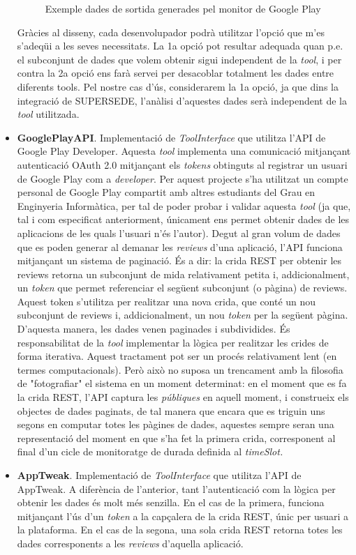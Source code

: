 \begin{itemize}
\begin{figure}[!h]
\decoRule
\caption[Exemple dades de sortida generades pel monitor de Google Play]{Exemple dades de sortida generades pel monitor de Google Play}
\label{fig:Figura13}
\end{figure}
Gràcies al disseny, cada desenvolupador podrà utilitzar l'opció que m'es s'adeqüi a les seves necessitats. La 1a opció pot resultar adequada quan p.e. el subconjunt de dades que volem obtenir sigui independent de la \textit{tool}, i per contra la 2a opció ens farà servei per desacoblar totalment les dades entre diferents tools. Pel nostre cas d'ús, considerarem la 1a opció, ja que dins la integració de SUPERSEDE, l'anàlisi d'aquestes dades serà independent de la \textit{tool} utilitzada.
\item \textbf{GooglePlayAPI}. Implementació de \textit{ToolInterface} que utilitza l'API de Google Play Developer. Aquesta \textit{tool} implementa una comunicació mitjançant autenticació OAuth 2.0 mitjançant els \textit{tokens} obtinguts al registrar un usuari de Google Play com a \textit{developer}. Per aquest projecte s'ha utilitzat un compte personal de Google Play compartit amb altres estudiants del Grau en Enginyeria Informàtica, per tal de poder probar i validar aquesta \textit{tool} (ja que, tal i com especificat anteriorment, únicament ens permet obtenir dades de les aplicacions de les quals l'usuari n'és l'autor). Degut al gran volum de dades que es poden generar al demanar les \textit{reviews} d'una aplicació, l'API funciona mitjançant un sistema de paginació. És a dir: la crida REST per obtenir les reviews retorna un subconjunt de mida relativament petita i, addicionalment, un \textit{token} que permet referenciar el següent subconjunt (o pàgina) de reviews. Aquest token s'utilitza per realitzar una nova crida, que conté un nou subconjunt de reviews i, addicionalment, un nou \textit{token} per la següent pàgina. D'aquesta manera, les dades venen paginades i subdividides. És responsabilitat de la \textit{tool} implementar la lògica per realitzar les crides de forma iterativa. 
Aquest tractament pot ser un procés relativament lent (en termes computacionals). Però això no suposa un trencament amb la filosofia de "fotografiar" el sistema en un moment determinat: en el moment que es fa la crida REST, l'API captura les \textit{públiques} en aquell moment, i construeix els objectes de dades paginats, de tal manera que encara que es triguin uns segons en computar totes les pàgines de dades, aquestes sempre seran una representació del moment en que s'ha fet la primera crida, corresponent al final d'un cicle de monitoratge de durada definida al \textit{timeSlot.}
\item \textbf{AppTweak}. Implementació de \textit{ToolInterface} que utilitza l'API de AppTweak. A diferència de l'anterior, tant l'autenticació com la lògica per obtenir les dades és molt més senzilla. En el cas de la primera, funciona mitjançant l'ús d'un \textit{token} a la capçalera de la crida REST, únic per usuari a la plataforma. En el cas de la segona, una sola crida REST retorna totes les dades corresponents a les \textit{reviews} d'aquella aplicació.
\end{itemize}

